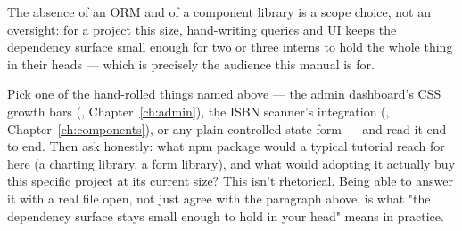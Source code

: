 The absence of an ORM and of a component library is a scope choice, not an oversight: for a project this size, hand-writing queries and UI keeps the dependency surface small enough for two or three interns to hold the whole thing in their heads — which is precisely the audience this manual is for.

\begin{olktask}
Pick one of the hand-rolled things named above — the admin dashboard's CSS growth bars (, Chapter~\ref{ch:admin}), the ISBN scanner's  integration (, Chapter~\ref{ch:components}), or any plain-controlled-state form — and read it end to end. Then ask honestly: what npm package would a typical tutorial reach for here (a charting library, a form library), and what would adopting it actually buy this specific project at its current size? This isn't rhetorical. Being able to answer it with a real file open, not just agree with the paragraph above, is what "the dependency surface stays small enough to hold in your head" means in practice.
\end{olktask}
